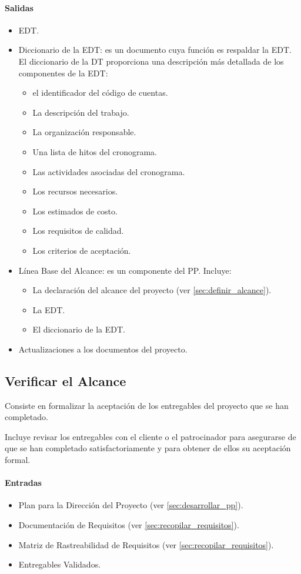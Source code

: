 \documentclass[a4paper,twosides]{article}
\newlength{\wideitemsep}
\let\olditem\item
\renewcommand{\item}{\setlength{\itemsep}{\wideitemsep}\olditem}
\begin{document}
\paragraph{Salidas}
\begin{itemize}
\item EDT.
\item Diccionario de la EDT: es un documento cuya función es respaldar la EDT. El diccionario de la DT proporciona una descripción más detallada de los componentes de la EDT:
\begin{itemize}
\item el identificador del código de cuentas.
\item La descripción del trabajo.
\item La organización responsable.
\item Una lista de hitos del cronograma.
\item Las actividades asociadas del cronograma.
\item Los recursos necesarios.
\item Los estimados de costo.
\item Los requisitos de calidad.
\item Los criterios de aceptación.
\end{itemize}
\item Línea Base del Alcance: es un componente del PP. Incluye:
\begin{itemize}
\item La declaración del alcance del proyecto (ver \ref{sec:definir_alcance}).
\item La EDT.
\item El diccionario de la EDT.
\end{itemize}
\item Actualizaciones a los documentos del proyecto.
\end{itemize}
\subsection{Verificar el Alcance} \label{sec:verificar_alcance}
\par Consiste en formalizar la aceptación de los entregables del proyecto que se han completado.
\par Incluye revisar los entregables con el cliente o el patrocinador para asegurarse de que se han completado satisfactoriamente y para obtener de ellos su aceptación formal.
\paragraph{Entradas}
\begin{itemize}
\item Plan para la Dirección del Proyecto (ver \ref{sec:desarrollar_pp}).
\item Documentación de Requisitos (ver \ref{sec:recopilar_requisitos}).
\item Matriz de Rastreabilidad de Requisitos (ver \ref{sec:recopilar_requisitos}).
\item Entregables Validados.
\end{itemize}
\end{document}
